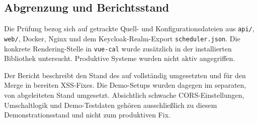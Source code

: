 \subsection{Abgrenzung und Berichtsstand}

Die Prüfung bezog sich auf getrackte Quell- und Konfigurationsdateien
aus \texttt{api/}, \texttt{web/}, Docker, Nginx und dem
Keycloak-Realm-Export \texttt{scheduler.json}. Die konkrete
Rendering-Stelle in \texttt{vue-cal} wurde zusätzlich in der
installierten Bibliothek untersucht. Produktive Systeme wurden nicht
aktiv angegriffen.

Der Bericht beschreibt den Stand des auf
 vollständig umgesetzten und für
den Merge in  bereiten XSS-Fixes. Die Demo-Setups
wurden dagegen im separaten, von  abgeleiteten
Stand  umgesetzt.
Absichtlich schwache CORS-Einstellungen, Umschaltlogik und
Demo-Testdaten gehören ausschließlich zu diesem Demonstrationsstand
und nicht zum produktiven Fix.
